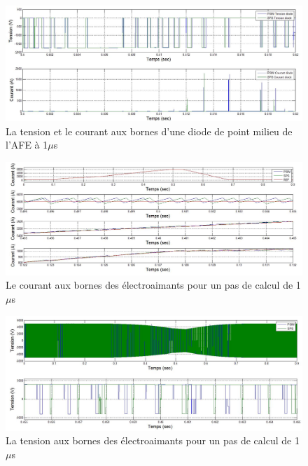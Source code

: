 \begin{figure}[htb]
\centering
\includegraphics[scale=0.5]{fig/DCP_AFE/1u/ten_diode_afe.jpg}
\caption{La tension et le courant aux bornes d'une diode de point milieu de l'AFE à 1$\mu$s}
\label{AF_DC_DI1}
\end{figure}


\begin{figure}[htb]
\centering
\includegraphics[scale=0.5]{fig/DCP_AFE/1u/cour_ch.jpg}
\caption{Le courant aux bornes des électroaimants pour un pas de calcul de 1$\mu$s}
\label{AF_DC_CHA1}
\end{figure}



\begin{figure}[htb]
\centering
\includegraphics[scale=0.5]{fig/DCP_AFE/1u/ten_ch.jpg}
\caption{La tension aux bornes des électroaimants pour un pas de calcul de 1$\mu$s}
\label{AF_DC_CHV1}
\end{figure}



